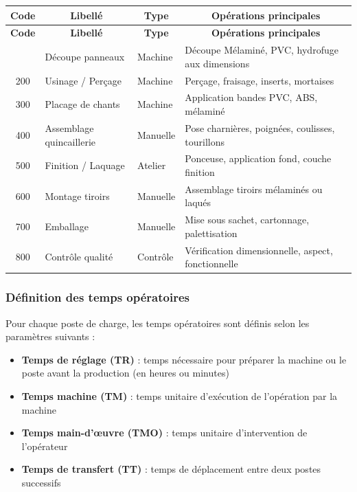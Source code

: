 \documentclass[12pt,a4paper]{article}
\begin{document}
\begin{longtable}{|c|p{4cm}|p{3cm}|p{6cm}|}
\hline
\multicolumn{1}{|c|}{\textbf{Code}} & \multicolumn{1}{c|}{\textbf{Libellé}} & \multicolumn{1}{c|}{\textbf{Type}} & \multicolumn{1}{c|}{\textbf{Opérations principales}} \\
\hline
\endfirsthead
\hline
\multicolumn{1}{|c|}{\textbf{Code}} & \multicolumn{1}{c|}{\textbf{Libellé}} & \multicolumn{1}{c|}{\textbf{Type}} & \multicolumn{1}{c|}{\textbf{Opérations principales}} \\
\hline
\endhead
\hline
\endfoot
100 & Découpe panneaux & Machine & Découpe Mélaminé, PVC, hydrofuge aux dimensions \\
200 & Usinage / Perçage & Machine & Perçage, fraisage, inserts, mortaises \\
300 & Placage de chants & Machine & Application bandes PVC, ABS, mélaminé \\
400 & Assemblage quincaillerie & Manuelle & Pose charnières, poignées, coulisses, tourillons \\
500 & Finition / Laquage & Atelier & Ponceuse, application fond, couche finition \\
600 & Montage tiroirs & Manuelle & Assemblage tiroirs mélaminés ou laqués \\
700 & Emballage & Manuelle & Mise sous sachet, cartonnage, palettisation \\
800 & Contrôle qualité & Contrôle & Vérification dimensionnelle, aspect, fonctionnelle \\
\hline
\end{longtable}

\subsubsection{Définition des temps opératoires}

Pour chaque poste de charge, les temps opératoires sont définis selon les paramètres suivants :

\begin{itemize}
    \item \textbf{Temps de réglage (TR)} : temps nécessaire pour préparer la machine ou le poste avant la production (en heures ou minutes)
    \item \textbf{Temps machine (TM)} : temps unitaire d'exécution de l'opération par la machine
    \item \textbf{Temps main-d'œuvre (TMO)} : temps unitaire d'intervention de l'opérateur
    \item \textbf{Temps de transfert (TT)} : temps de déplacement entre deux postes successifs
\end{itemize}
\end{document}
